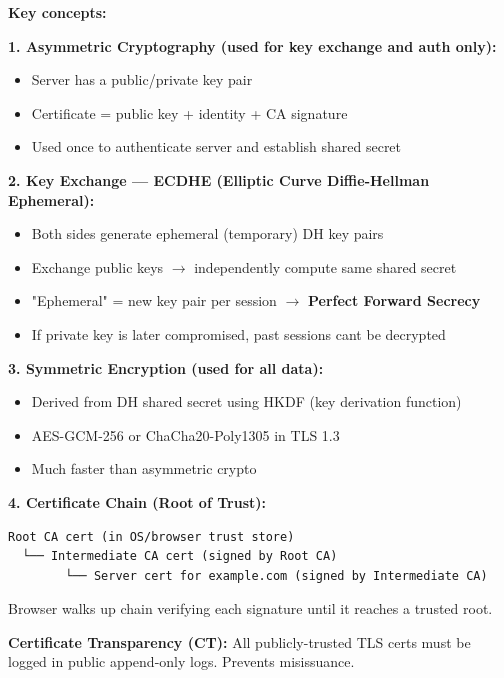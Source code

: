 \documentclass[11pt]{article}
\providecommand{\tightlist}{\setlength{\itemsep}{1pt}\setlength{\parskip}{0pt}}
\begin{document}
\textbf{Key concepts:}

\textbf{1. Asymmetric Cryptography (used for key exchange and auth only):}

\begin{itemize}
\tightlist
\item
  Server has a public/private key pair
\item
  Certificate = public key + identity + CA signature
\item
  Used once to authenticate server and establish shared secret
\end{itemize}

\textbf{2. Key Exchange --- ECDHE (Elliptic Curve Diffie-Hellman Ephemeral):}

\begin{itemize}
\tightlist
\item
  Both sides generate ephemeral (temporary) DH key pairs
\item
  Exchange public keys \(\rightarrow\) independently compute same shared secret
\item
  "Ephemeral" = new key pair per session \(\rightarrow\) \textbf{Perfect Forward Secrecy}
\item
  If private key is later compromised, past sessions can\textquotesingle t be decrypted
\end{itemize}

\textbf{3. Symmetric Encryption (used for all data):}

\begin{itemize}
\tightlist
\item
  Derived from DH shared secret using HKDF (key derivation function)
\item
  AES-GCM-256 or ChaCha20-Poly1305 in TLS 1.3
\item
  Much faster than asymmetric crypto
\end{itemize}

\textbf{4. Certificate Chain (Root of Trust):}

\setcodelang{}

\begin{verbatim}
Root CA cert (in OS/browser trust store)
  └── Intermediate CA cert (signed by Root CA)
        └── Server cert for example.com (signed by Intermediate CA)
\end{verbatim}

Browser walks up chain verifying each signature until it reaches a trusted root.

\textbf{Certificate Transparency (CT):} All publicly-trusted TLS certs must be logged in public append-only logs. Prevents misissuance.
\end{document}
